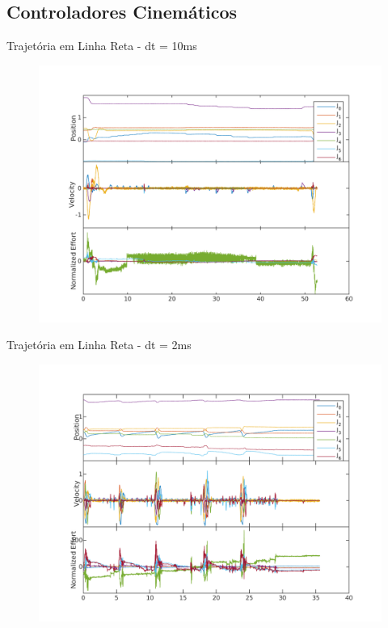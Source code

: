 \documentclass{beamer}
\begin{document}
\subsection{Controladores Cinemáticos}

\begin{frame}{Trajetória em Linha Reta - dt = 10ms}
   \begin{figure}
    \centering
    \includegraphics[width = 0.9\linewidth]{tex/figs/moveUp1stateEvalv70s10.png}
    \label{fig:mekademo}
\end{figure}
\end{frame}

\begin{frame}{Trajetória em Linha Reta - dt = 2ms}
   \begin{figure}
    \centering
    \includegraphics[width = 0.9\linewidth]{tex/figs/moveUp3stateEvalv70s50.png}
    \label{fig:mekademo}
\end{figure}
\end{frame}
\end{document}
